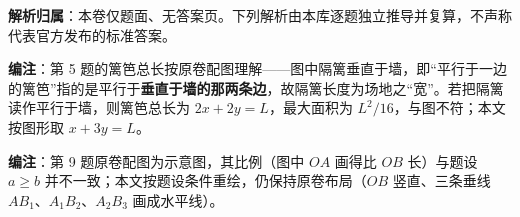 

\begin{gknotice}
\textbf{解析归属}：本卷仅题面、无答案页。下列解析由本库逐题独立推导并复算，不声称代表官方发布的标准答案。

\textbf{编注}：第 5 题的篱笆总长按原卷配图理解——图中隔篱垂直于墙，即“平行于一边的篱笆”指的是平行于\textbf{垂直于墙的那两条边}，故隔篱长度为场地之“宽”。若把隔篱读作平行于墙，则篱笆总长为 $2x+2y=L$，最大面积为 $L^2/16$，与图不符；本文按图形取 $x+3y=L$。

\textbf{编注}：第 9 题原卷配图为示意图，其比例（图中 $OA$ 画得比 $OB$ 长）与题设 $a\ge b$ 并不一致；本文按题设条件重绘，仍保持原卷布局（$OB$ 竖直、三条垂线 $AB_1$、$A_1B_2$、$A_2B_3$ 画成水平线）。
\end{gknotice}

